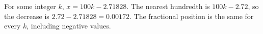 For some integer $k$, $x=100k-2.71828$. The nearest hundredth is $100k-2.72$, so the decrease is $2.72-2.71828=\boxed{0.00172}$. The fractional position is the same for every $k$, including negative values.
